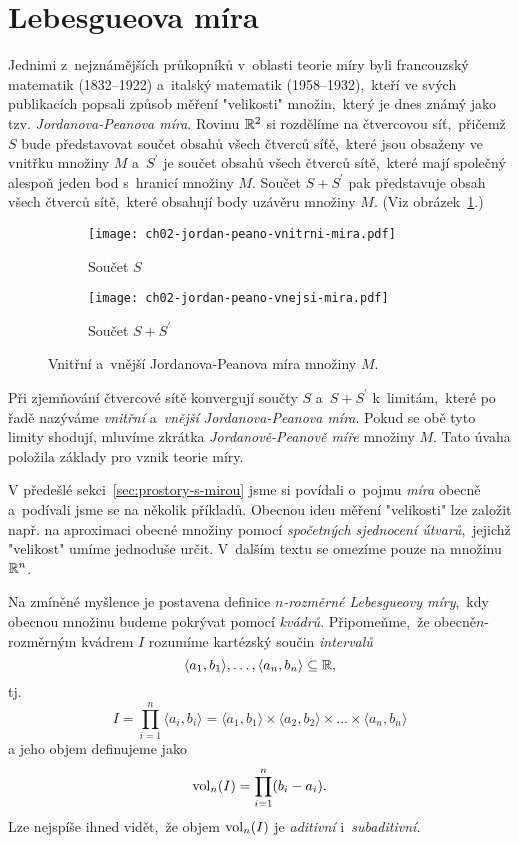 \section{Lebesgueova míra}\label{sec:lebesgueova-mira}

Jednimi z~nejznámějších průkopníků v~oblasti teorie míry byli francouzský matematik  (1832--1922) a~italský matematik  (1958--1932),~kteří ve svých publikacích popsali způsob měření "velikosti" množin,~který je dnes známý jako tzv. \emph{Jordanova-Peanova míra}. Rovinu $\mathbb{R}^2$ si rozdělíme na čtvercovou síť,~přičemž $S$ bude představovat součet obsahů všech čtverců síťě,~které jsou obsaženy ve vnitřku množiny $M$ a~$S^\prime$ je součet obsahů všech čtverců sítě,~které mají společný alespoň jeden bod s~hranicí množiny $M$. Součet $S+S^\prime$ pak představuje obsah všech čtverců sítě,~které obsahují body uzávěru množiny $M$. (Viz obrázek~\ref{fig:jordan-peano-mira}.)
\begin{figure}[h]
    \centering
    \begin{subfigure}{0.4\textwidth}
        \centering
        \texttt{[image: ch02-jordan-peano-vnitrni-mira.pdf]}
        \caption{Součet $S$}
    \end{subfigure}
    \qquad
    \begin{subfigure}{0.4\textwidth}
        \centering
        \texttt{[image: ch02-jordan-peano-vnejsi-mira.pdf]}
        \caption{Součet $S+S^\prime$}
    \end{subfigure}
    \caption{Vnitřní a~vnější Jordanova-Peanova míra množiny $M$.}
    \label{fig:jordan-peano-mira}
\end{figure}
Při zjemňování čtvercové sítě konvergují součty $S$ a~$S+S^\prime$ k~limitám,~které po řadě nazýváme \emph{vnitřní} a~\emph{vnější Jordanova-Peanova míra}. Pokud se obě tyto limity shodují, mluvíme zkrátka \emph{Jordanově-Peanově míře} množiny $M$. Tato úvaha položila základy pro vznik teorie míry. \cite{Sarmanova1996}

V předešlé sekci~\ref{sec:prostory-s-mirou} jsme si povídali o~pojmu \emph{míra} obecně a~podívali jsme se na několik příkladů. Obecnou ideu měření "velikosti" lze založit např. na aproximaci obecné množiny pomocí \emph{spočetných sjednocení útvarů},~jejichž "velikost" umíme jednoduše určit. V~dalším textu se omezíme pouze na množinu $\mathbb{R}^n$.

Na zmíněné myšlence je postavena definice \emph{$n$-rozměrné Lebesgueovy míry},~kdy obecnou množinu budeme pokrývat pomocí \emph{kvádrů}. Připomeňme,~že obecně\linebreak\mbox{$n$-rozměrným} kvádrem $I$ rozumíme kartézský součin \emph{intervalů}
\[\langle a_1,b_1\rangle,\ldots,\langle a_n,b_n\rangle\subseteq\mathbb{R},\]
tj.
\[I=\prod_{i=1}^{n}\langle a_i,b_i\rangle=\langle a_1,b_1\rangle\times\langle a_2,b_2\rangle\times\dots\times\langle a_n,b_n\rangle\]
a jeho objem definujeme jako
\[\operatorname{vol}_n(I)=\prod_{i=1}^{n}(b_i-a_i).\]
Lze nejspíše ihned vidět,~že objem $\operatorname{vol}_n(I)$ je \emph{aditivní} i~\textit{subaditivní}.

